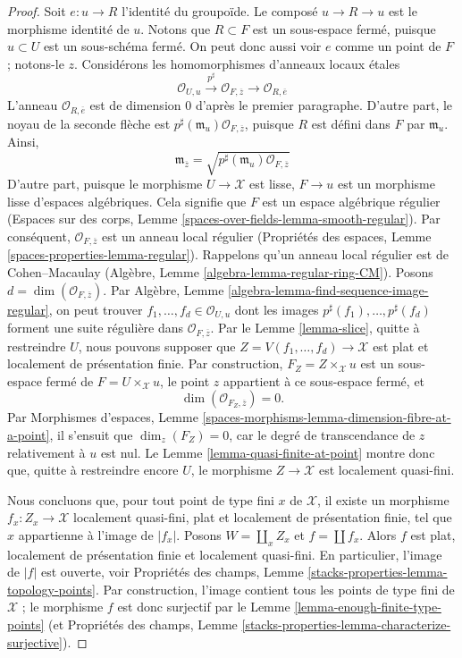 \begin{proof}
\medskip\noindent
Soit $e : u \to R$ l'identité du groupoïde. Le composé
$u \to R \to u$ est le morphisme identité de $u$.
Notons que $R \subset F$ est un sous-espace fermé, puisque $u \subset U$ est
un sous-schéma fermé. On peut donc aussi voir $e$ comme un point de $F$ ;
notons-le $z$. Considérons les homomorphismes d'anneaux locaux étales
$$
\mathcal{O}_{U, u}
\xrightarrow{p^\sharp}
\mathcal{O}_{F, \overline{z}}
\longrightarrow
\mathcal{O}_{R, \overline{e}}
$$
L'anneau $\mathcal{O}_{R, \overline{e}}$ est de dimension $0$ d'après le
premier paragraphe. D'autre part, le noyau de la seconde flèche est
$p^\sharp(\mathfrak m_u)\mathcal{O}_{F, \overline{z}}$, puisque $R$ est défini
dans $F$ par $\mathfrak m_u$. Ainsi,
$$
\mathfrak m_{\overline{z}} =
\sqrt{p^\sharp(\mathfrak m_u)\mathcal{O}_{F, \overline{z}}}
$$
D'autre part, puisque le morphisme $U \to \mathcal{X}$ est lisse,
$F \to u$ est un morphisme lisse d'espaces algébriques.
Cela signifie que $F$ est un espace algébrique régulier
(Espaces sur des corps, Lemme \ref{spaces-over-fields-lemma-smooth-regular}).
Par conséquent, $\mathcal{O}_{F, \overline{z}}$ est un anneau local régulier
(Propriétés des espaces, Lemme \ref{spaces-properties-lemma-regular}).
Rappelons qu'un anneau local régulier est de Cohen--Macaulay
(Algèbre, Lemme \ref{algebra-lemma-regular-ring-CM}).
Posons $d = \dim(\mathcal{O}_{F, \overline{z}})$. Par Algèbre,
Lemme \ref{algebra-lemma-find-sequence-image-regular}, on peut trouver
$f_1, \ldots, f_d \in \mathcal{O}_{U, u}$ dont les images
$p^\sharp(f_1), \ldots, p^\sharp(f_d)$ forment une suite régulière dans
$\mathcal{O}_{F, \overline{z}}$. Par le Lemme \ref{lemma-slice}, quitte à
restreindre $U$, nous pouvons supposer que
$Z = V(f_1, \ldots, f_d) \to \mathcal{X}$ est plat et localement de
présentation finie. Par construction,
$F_Z = Z \times_\mathcal{X} u$ est un sous-espace fermé de
$F = U \times_\mathcal{X} u$, le point $z$ appartient à ce sous-espace fermé,
et
$$
\dim(\mathcal{O}_{F_Z, \overline{z}}) = 0.
$$
Par Morphismes d'espaces,
Lemme \ref{spaces-morphisms-lemma-dimension-fibre-at-a-point},
il s'ensuit que $\dim_z(F_Z) = 0$, car le degré de transcendance de $z$
relativement à $u$ est nul. Le Lemme \ref{lemma-quasi-finite-at-point} montre
donc que, quitte à restreindre encore $U$, le morphisme
$Z \to \mathcal{X}$ est localement quasi-fini.

\medskip\noindent
Nous concluons que, pour tout point de type fini $x$ de $\mathcal{X}$, il
existe un morphisme $f_x : Z_x \to \mathcal{X}$ localement quasi-fini, plat
et localement de présentation finie, tel que $x$ appartienne à l'image de
$|f_x|$. Posons $W = \coprod_x Z_x$ et $f = \coprod f_x$. Alors $f$ est plat,
localement de présentation finie et localement quasi-fini. En particulier,
l'image de $|f|$ est ouverte, voir Propriétés des champs,
Lemme \ref{stacks-properties-lemma-topology-points}.
Par construction, l'image contient tous les points de type fini de
$\mathcal{X}$ ; le morphisme $f$ est donc surjectif par le
Lemme \ref{lemma-enough-finite-type-points} (et Propriétés des champs,
Lemme \ref{stacks-properties-lemma-characterize-surjective}).
\end{proof}

